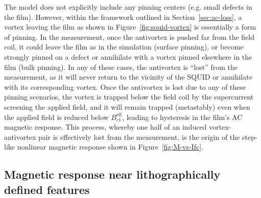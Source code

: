 \documentclass[%
 reprint,
 superscriptaddress,
 amsmath,
 amssymb,
 amsfonts,
 aps,
 prb,
]{revtex4-2}
\begin{document}
The model does not explicitly include any pinning centers (e.g. small defects in the film). However, within the framework outlined in Section~\ref{sec:ac-loss}, a vortex leaving the film as shown in Figure~\ref{fig:squid-vortex} is essentially a form of pinning. In the measurement, once the antivortex is pushed far from the field coil, it could leave the film as in the simulation (surface pinning), or become strongly pinned on a defect or annihilate with a vortex pinned elsewhere in the film (bulk pinning). In any of these cases, the antivortex is ``lost'' from the measurement, as it will never return to the vicinity of the SQUID or annihilate with its corresponding vortex. Once the antivortex is lost due to any of these pinning scenarios, the vortex is trapped below the field coil by the supercurrent screening the applied field, and it will remain trapped (metastably) even when the applied field is reduced below $B_{c1}^\mathrm{eff}$, leading to hysteresis in the film's AC magnetic response. This process, whereby one half of an induced vortex-antivortex pair is effectively lost from the measurement, is the origin of the step-like nonlinear magnetic response shown in Figure~\ref{fig:M-vs-Ifc}.


\subsection{Magnetic response near lithographically defined features}
\label{sec:slot}
\end{document}
